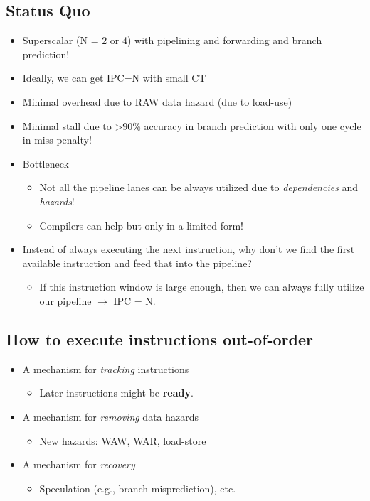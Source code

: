 \documentclass[10pt]{article}
\begin{document}
\subsection*{Status Quo}
\begin{itemize}
    \item Superscalar (N = 2 or 4) with pipelining and forwarding and branch prediction!
    \item Ideally, we can get IPC=N with small CT
    \item Minimal overhead due to RAW data hazard (due to load-use)
    \item Minimal stall due to >90\% accuracy in branch prediction with only one cycle in miss penalty!
    \item Bottleneck
    \begin{itemize}
        \item Not all the pipeline lanes can be always utilized due to \textit{dependencies} and \textit{hazards}!
        \item Compilers can help but only in a limited form!
    \end{itemize}
    \item Instead of always executing the next instruction, why don't we find the first available instruction and feed that into the pipeline?
    \begin{itemize}
        \item If this instruction window is large enough, then we can always fully utilize our pipeline $\rightarrow$ IPC = N.
    \end{itemize}
\end{itemize}

\subsection*{How to execute instructions out-of-order}
\begin{itemize}
    \item A mechanism for \textit{tracking} instructions
    \begin{itemize}
        \item Later instructions might be \textbf{ready}.
    \end{itemize}
    \item A mechanism for \textit{removing} data hazards
    \begin{itemize}
        \item New hazards: WAW, WAR, load-store
    \end{itemize}
    \item A mechanism for \textit{recovery}
    \begin{itemize}
        \item Speculation (e.g., branch misprediction), etc.
    \end{itemize}
\end{itemize}
\end{document}
